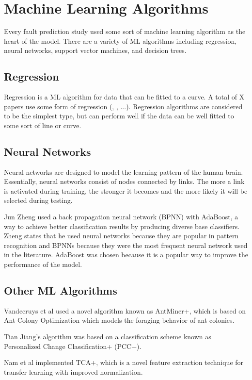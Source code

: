 \documentclass{sig-alternate-05-2015}
\begin{document}
\section{Machine Learning Algorithms}

Every fault prediction study used some sort of machine learning algorithm as the heart of the model. There are a variety of ML algorithms including regression, neural networks, support vector machines, and decision trees.

\subsection{Regression}
Regression is a ML algorithm for data that can be fitted to a curve. A total of X papers use some form of regression (\cite{Posnett}, \cite{Rahman}, ...). Regression algorithms are considered to be the simplest type, but can perform well if the data can be well fitted to some sort of line or curve.

\subsection{Neural Networks}
Neural networks are designed to model the learning pattern of the human brain. Essentially, neural networks consist of nodes connected by links. The more a link is activated during training, the stronger it becomes and the more likely it will be selected during testing. 

Jun Zheng \cite{zheng2010} used a back propagation neural network (BPNN) with AdaBoost, a way to achieve better classification results by producing diverse base classifiers. Zheng states that he used neural networks because they are popular in pattern recognition and BPNNs because they were the most frequent neural network used in the literature. AdaBoost was chosen because it is a popular way to improve the performance of the model.

\subsection{Other ML Algorithms}
Vandecruys et al \cite{Vandecruys} used a novel algorithm known as AntMiner+, which is based on Ant Colony Optimization which models the foraging behavior of ant colonies. 

Tian Jiang's algorithm \cite{Jiang} was based on a classification scheme known as Personalized Change Classification+ (PCC+).

Nam et al \cite{Nam} implemented TCA+, which is a novel feature extraction technique for transfer learning with improved normalization.
\end{document}
